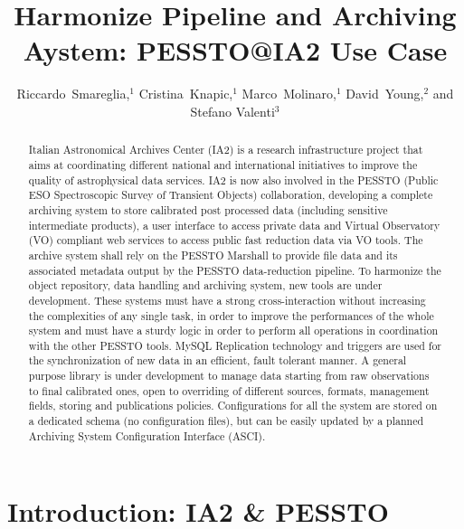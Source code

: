 
\resetcounters




\title{Harmonize Pipeline and Archiving Aystem: PESSTO@IA2 Use Case}
\author{Riccardo~Smareglia,$^1$ Cristina~Knapic,$^1$ Marco~Molinaro,$^1$ David~Young,$^2$ and Stefano Valenti$^3$
}


\begin{abstract}
Italian Astronomical Archives Center (IA2) is a research infrastructure project that aims at coordinating different national and international initiatives to improve the quality of astrophysical data services. IA2 is now also involved in the PESSTO (Public ESO Spectroscopic Survey of Transient Objects) collaboration, developing a complete archiving system to store calibrated post processed data (including sensitive intermediate products), a user interface to access private data and Virtual Observatory (VO) compliant web services to access public fast reduction data via VO tools. The archive system shall rely on the PESSTO Marshall to provide file data and its associated metadata output by the PESSTO data-reduction pipeline. To harmonize the object repository, data handling and archiving system, new tools are under development. These systems must have a strong cross-interaction without increasing the complexities of any single task, in order to improve the performances of the whole system and must have a sturdy logic in order to perform all operations in coordination with the other PESSTO tools. MySQL Replication technology and triggers are used for the synchronization of new data in an efficient, fault tolerant manner. A general purpose library is under development to manage data starting from raw observations to final calibrated ones, open to overriding of different sources, formats, management fields, storing and publications policies. Configurations for all the system are stored on a dedicated schema (no configuration files), but can be easily updated by a planned Archiving System Configuration Interface (ASCI). 
\end{abstract}

\section{Introduction: IA2 \& PESSTO}

